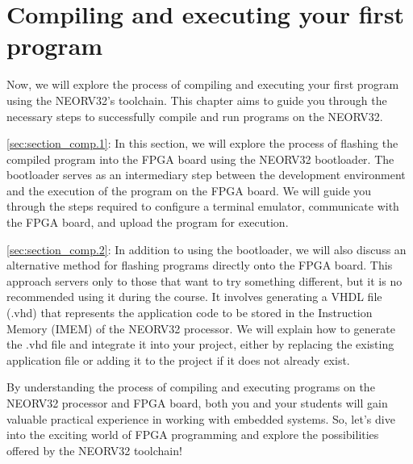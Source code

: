 \chapter{Compiling and executing your first program} \label{ch:chapter_comp}

    Now, we will explore the process of compiling and executing your first program using the NEORV32's toolchain. This chapter aims to guide you through the necessary steps to successfully compile and run programs on the NEORV32.
    
    \autoref{sec:section_comp.1}: In this section, we will explore the process of flashing the compiled program into the FPGA board using the NEORV32 bootloader. The bootloader serves as an intermediary step between the development environment and the execution of the program on the FPGA board. We will guide you through the steps required to configure a terminal emulator, communicate with the FPGA board, and upload the program for execution.
    
    \autoref{sec:section_comp.2}: In addition to using the bootloader, we will also discuss an alternative method for flashing programs directly onto the FPGA board. This approach servers only to those that want to try something different, but it is no recommended using it during the course. It involves generating a VHDL file (.vhd) that represents the application code to be stored in the Instruction Memory (IMEM) of the NEORV32 processor. We will explain how to generate the .vhd file and integrate it into your project, either by replacing the existing application file or adding it to the project if it does not already exist.
    
    By understanding the process of compiling and executing programs on the NEORV32 processor and FPGA board, both you and your students will gain valuable practical experience in working with embedded systems. So, let's dive into the exciting world of FPGA programming and explore the possibilities offered by the NEORV32 toolchain!
    
    
    
        
        
